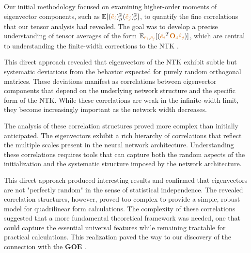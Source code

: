 \documentclass[a4paper]{article}
\theoremstyle{plain}
\theoremstyle{definition}
\theoremstyle{remark}
\begin{document}
\begin{tcolorbox}[colback=blue!10,colframe=blue!10,title={\textbf{🔍 INITIAL APPROACH: Direct Statistical Analysis}},enhanced,drop shadow]
Our initial methodology focused on examining higher-order moments of eigenvector components, such as $\mathbb{E}[(\textcolor{orange!80!black}{\hat{e}_i})_\mu^2 (\textcolor{orange!80!black}{\hat{e}_j})_\nu^2]$, to quantify the fine correlations that our tensor analysis had revealed. The goal was to develop a precise understanding of tensor averages of the form $\mathbb{E}_{\textcolor{orange!80!black}{\hat{e}_i}, \textcolor{orange!80!black}{\hat{e}_j}}[(\textcolor{orange!80!black}{\hat{e}_{i}}^{T}\textcolor{orange!80!black}{\mathbf{O}_{4}}\textcolor{orange!80!black}{\hat{e}_{j}})]$, which are central to understanding the finite-width corrections to the NTK \cite{bach2017breaking}.
\end{tcolorbox}

This direct approach revealed that eigenvectors of the NTK exhibit subtle but systematic deviations from the behavior expected for purely random orthogonal matrices. These deviations manifest as correlations between eigenvector components that depend on the underlying network structure and the specific form of the NTK. While these correlations are weak in the infinite-width limit, they become increasingly important as the network width decreases.

The analysis of these correlation structures proved more complex than initially anticipated. The eigenvectors exhibit a rich hierarchy of correlations that reflect the multiple scales present in the neural network architecture. Understanding these correlations requires tools that can capture both the random aspects of the initialization and the systematic structure imposed by the network architecture.

\begin{tcolorbox}[colback=green!10,colframe=green!60!black,title={\textbf{📝 GENERAL REMARK: Partial Success but Complexity}},enhanced,drop shadow]
This direct approach produced interesting results and confirmed that eigenvectors are not "perfectly random" in the sense of statistical independence. The revealed correlation structures, however, proved too complex to provide a simple, robust model for quadrilinear form calculations. The complexity of these correlations suggested that a more fundamental theoretical framework was needed, one that could capture the essential universal features while remaining tractable for practical calculations. This realization paved the way to our discovery of the connection with the \textcolor{purple!80!black}{\textbf{GOE}} \cite{doumeche2023sobolev_ntk}.
\end{tcolorbox}
\end{document}
